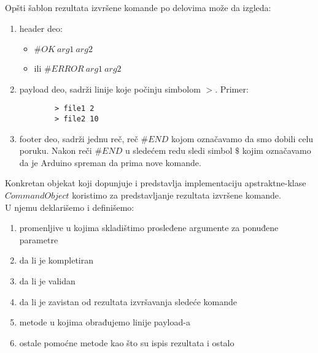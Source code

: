 \documentclass[a4paper]{extarticle}
\begin{document}
	Opšti šablon rezultata izvršene komande po delovima može da izgleda: 
	\begin{enumerate}
		\item header deo:
		\begin{itemize}
			\item $\#OK \: arg1 \: arg2$
			\item ili $\#ERROR \: arg1 \: arg2$
		\end{itemize}
		\item payload deo, sadrži linije koje počinju simbolom $>$. Primer:
		\begin{verbatim}
		> file1 2
		> file2 10
		\end{verbatim}
		\item footer deo, sadrži jednu reč, reč $\#END$ kojom označavamo da smo dobili celu poruku. Nakon reči $\#END$ u sledećem redu sledi simbol $\$$ kojim označavamo da je Arduino spreman da prima nove komande.
	\end{enumerate}
	
	Konkretan objekat koji dopunjuje i predstavlja implementaciju apstraktne-klase $CommandObject$ koristimo za predstavljanje rezultata izvršene komande.\\ U njemu deklarišemo i definišemo:
	 \begin{enumerate}
	 	\item promenljive u kojima skladištimo prosleđene argumente za ponuđene parametre
	 	\item da li je kompletiran
	 	\item da li je validan 
	 	\item da li je zavistan od rezultata izvršavanja sledeće komande
	 	\item  metode u kojima obrađujemo linije payload-a
	 	\item ostale pomoćne metode kao što su ispis rezultata i ostalo
	 \end{enumerate} 
 
\end{document}
